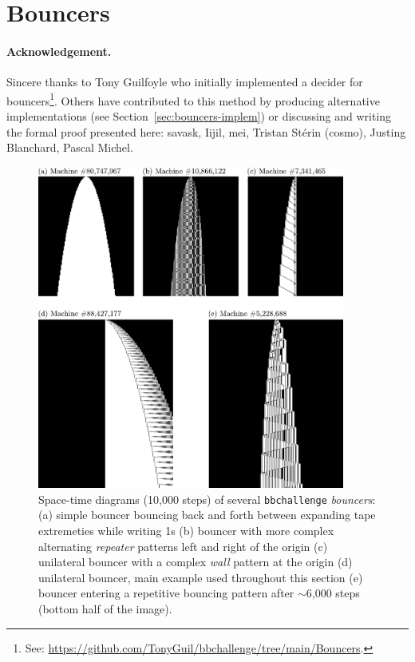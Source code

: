 
\section{Bouncers}\label{sec:bouncers}

\paragraph{Acknowledgement.}  Sincere thanks to Tony Guilfoyle who initially implemented a decider for bouncers\footnote{See: \url{https://github.com/TonyGuil/bbchallenge/tree/main/Bouncers}.}.
Others have contributed to this method by producing alternative implementations (see Section~\ref{sec:bouncers-implem}) or discussing and writing the formal proof presented here: savask, Iijil, mei, Tristan Stérin (cosmo), Justing Blanchard, Pascal Michel.


\begin{figure}[h!]
    \centering
    \includegraphics*[width=0.9\textwidth]{figures/bouncers/bouncers.pdf}
    \caption{Space-time diagrams (10,000 steps) of several \texttt{bbchallenge} \textit{bouncers}: (a) simple bouncer bouncing back and forth between expanding tape extremeties while writing 1s (b) bouncer with more complex alternating \textit{repeater} patterns left and right of the origin (c) unilateral bouncer with a complex \textit{wall} pattern at the origin (d) unilateral bouncer, main example used throughout this section (e) bouncer entering a repetitive bouncing pattern after $\sim$6,000 steps (bottom half of the image).}\label{fig:bouncers}
\end{figure}

